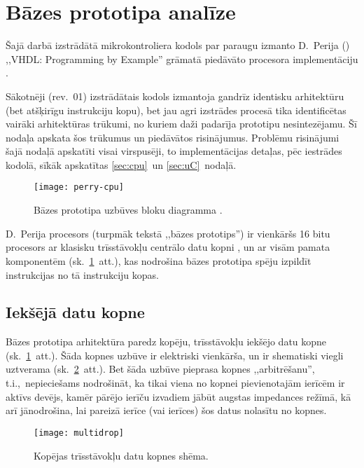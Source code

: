 \section{Bāzes prototipa analīze}
Šajā darbā izstrādātā mikrokontroliera kodols par paraugu izmanto
D.~Perija () ,,VHDL: Programming by Example'' grāmatā
piedāvāto procesora imple\-men\-tā\-ciju \cite{Perry-VHDL}.

Sākotnēji (rev.~01) izstrādātais kodols izmantoja gandrīz identisku
arhitektūru (bet atšķirīgu instrukciju kopu), bet
jau agri izstrādes procesā tika identificētas vairāki arhitektūras trūkumi,
no kuriem daži padarīja prototipu nesintezējamu.
Šī nodaļa apskata šos trūkumus un piedāvātos risinājumus.
Problēmu risinājumi šajā nodaļā apskatīti visai virspusēji,
to implementācijas detaļas, pēc iestrādes kodolā,
sīkāk apskatītas \ref{sec:cpu}~un \ref{sec:uC}~nodaļā.

\begin{figure}[thb]
	\centering
	\texttt{[image: perry-cpu]}
	\caption[Bāzes prototipa uzbūves bloku diagramma.]
	        {Bāzes prototipa uzbūves bloku diagramma \cite[290.~lpp.]{Perry-VHDL}.}
	\label{fig:perry-cpu}
\end{figure}

D.~Perija procesors (turpmāk tekstā ,,bāzes prototips'')
ir vienkāršs 16 bitu procesors ar klasisku trīsstāvokļu 
centrālo datu kopni \cite{Flynn-arch}\cite{Heath}, un ar visām pamata
komponentēm (sk.~\ref{fig:perry-cpu}~att.), kas nodrošina bāzes prototipa
spēju izpildīt instrukcijas no tā instrukciju kopas.

\subsection{Iekšējā datu kopne} \label{sec:perry-bus}
	Bāzes prototipa arhitektūra paredz kopēju, trīsstāvokļu iekšējo datu kopne
	(sk.~\ref{fig:perry-cpu}~att.).
	Šāda kopnes uzbūve ir elektriski vienkārša, un ir shematiski viegli uztverama
	(sk.~\ref{fig:multidrop}~att.). Bet šāda uzbūve pieprasa kopnes
	,,arbitrēšanu'', t.i.,~nepieciešams
	nodrošināt, ka tikai viena no kopnei pievienotajām ierīcēm ir aktīvs devējs,
	kamēr pārējo ierīču izvadiem jābūt augstas impedances režīmā, kā arī
	jānodrošina, lai pareizā ierīce (vai ierīces) šos datus nolasītu no kopnes.

	\begin{figure}[thb]
		\centering
		\texttt{[image: multidrop]}
		\caption{Kopējas trīsstāvokļu datu kopnes shēma.}
		\label{fig:multidrop}
	\end{figure}

